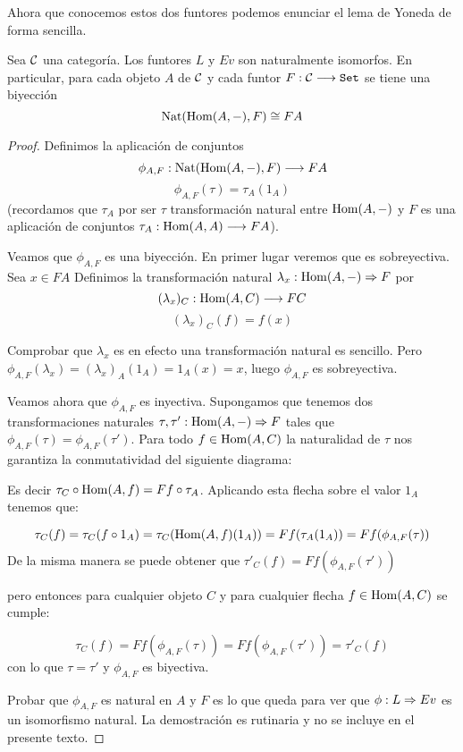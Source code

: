Ahora que conocemos estos dos funtores podemos enunciar el lema
de Yoneda de forma sencilla.

\begin{theorem}
  Sea $\mathcal{C}$ una categoría. Los funtores $L$ y $Ev$ son naturalmente isomorfos.
  En particular, para cada objeto $A$ de $\mathcal{C}$ y cada funtor $F : \mathcal{C}\longrightarrow \texttt{Set}$
  se tiene una biyección
  $$\operatorname{Nat}(\operatorname{Hom}(A, -), F) \cong FA$$
\end{theorem}
\begin{proof}
  Definimos la aplicación de conjuntos
  $$\phi_{A, F} : \operatorname{Nat}(\operatorname{Hom}(A, -), F)\longrightarrow FA$$
  $$\phi_{A, F}(\tau) = \tau_A (1_A)$$
  (recordamos que $\tau_A$ por ser $\tau$ transformación natural entre $\operatorname{Hom}(A, -)$ y $F$ es
  una aplicación de conjuntos $\tau_A : \operatorname{Hom}(A, A)\longrightarrow F A$).

  Veamos que $\phi_{A, F}$ es una biyección. En primer lugar veremos que es sobreyectiva. Sea $x \in FA$
  Definimos la transformación natural $\lambda_x : \operatorname{Hom}(A, -)\Rightarrow F$ por
  $$(\lambda_x)_C : \operatorname{Hom}(A, C)\longrightarrow F C$$
  $$(\lambda_x)_C(f) = f(x)$$

  Comprobar que $\lambda_x$ es en efecto una transformación natural es sencillo. Pero
  $\phi_{A, F}(\lambda_x) = (\lambda_x)_A (1_A) = 1_A(x) = x$, luego $\phi_{A, F}$
  es sobreyectiva.

  Veamos ahora que $\phi_{A, F}$ es inyectiva. Supongamos que tenemos
  dos transformaciones naturales $\tau, \tau' : \operatorname{Hom}(A, -)\Rightarrow F$
  tales que $\phi_{A, F}(\tau) = \phi_{A, F}(\tau')$. Para todo $f \in \operatorname{Hom}(A, C)$
  la naturalidad de $\tau$ nos garantiza la conmutatividad
  del siguiente diagrama:

  \begin{center}
  \end{center}


  Es decir $\tau_C \circ \operatorname{Hom}(A, f) = F f \circ \tau_A$. Aplicando
  esta flecha sobre el valor $1_A$ tenemos que:

  $$\tau_C(f) = \tau_C(f \circ 1_A) = \tau_C(\operatorname{Hom}(A, f)(1_A)) = F f(\tau_A(1_A)) = Ff(\phi_{A, F}(\tau))$$
  De la misma manera se puede obtener que $\tau'_C(f)  = Ff(\phi_{A, F}(\tau'))$

  pero entonces para cualquier objeto $C$ y para cualquier flecha $f \in \operatorname{Hom}(A, C)$
  se cumple:

  $$\tau_C(f) = Ff (\phi_{A,F}(\tau)) = Ff(\phi_{A, F}(\tau')) = \tau'_C(f)$$
  con lo que $\tau = \tau'$ y $\phi_{A, F}$ es biyectiva.


  Probar que $\phi_{A, F}$ es natural en $A$ y $F$ es lo que queda para ver
  que $\phi : L\Rightarrow Ev$ es un isomorfismo natural. La demostración es
  rutinaria y no se incluye en el presente texto.
\end{proof}

